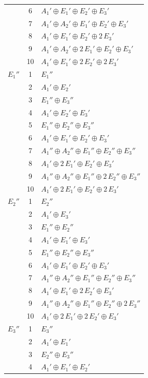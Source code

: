 \documentclass[11pt]{article}
\begin{document}
\begin{longtable}{l c p{}}
 & 6 & $A_{1}'\oplus E_{1}'\oplus E_{2}'\oplus E_{3}'$\\
 & 7 & $A_{1}'\oplus A_{2}'\oplus E_{1}'\oplus E_{2}'\oplus E_{3}'$\\
 & 8 & $A_{1}'\oplus E_{1}'\oplus E_{2}'\oplus 2\,E_{3}'$\\
 & 9 & $A_{1}'\oplus A_{2}'\oplus 2\,E_{1}'\oplus E_{2}'\oplus E_{3}'$\\
 & 10 & $A_{1}'\oplus E_{1}'\oplus 2\,E_{2}'\oplus 2\,E_{3}'$\\
\hline
$E_{1}''$ & 1 & $E_{1}''$\\
 & 2 & $A_{1}'\oplus E_{2}'$\\
 & 3 & $E_{1}''\oplus E_{3}''$\\
 & 4 & $A_{1}'\oplus E_{2}'\oplus E_{3}'$\\
 & 5 & $E_{1}''\oplus E_{2}''\oplus E_{3}''$\\
 & 6 & $A_{1}'\oplus E_{1}'\oplus E_{2}'\oplus E_{3}'$\\
 & 7 & $A_{1}''\oplus A_{2}''\oplus E_{1}''\oplus E_{2}''\oplus E_{3}''$\\
 & 8 & $A_{1}'\oplus 2\,E_{1}'\oplus E_{2}'\oplus E_{3}'$\\
 & 9 & $A_{1}''\oplus A_{2}''\oplus E_{1}''\oplus 2\,E_{2}''\oplus E_{3}''$\\
 & 10 & $A_{1}'\oplus 2\,E_{1}'\oplus E_{2}'\oplus 2\,E_{3}'$\\
\hline
$E_{2}''$ & 1 & $E_{2}''$\\
 & 2 & $A_{1}'\oplus E_{3}'$\\
 & 3 & $E_{1}''\oplus E_{2}''$\\
 & 4 & $A_{1}'\oplus E_{1}'\oplus E_{3}'$\\
 & 5 & $E_{1}''\oplus E_{2}''\oplus E_{3}''$\\
 & 6 & $A_{1}'\oplus E_{1}'\oplus E_{2}'\oplus E_{3}'$\\
 & 7 & $A_{1}''\oplus A_{2}''\oplus E_{1}''\oplus E_{2}''\oplus E_{3}''$\\
 & 8 & $A_{1}'\oplus E_{1}'\oplus 2\,E_{2}'\oplus E_{3}'$\\
 & 9 & $A_{1}''\oplus A_{2}''\oplus E_{1}''\oplus E_{2}''\oplus 2\,E_{3}''$\\
 & 10 & $A_{1}'\oplus 2\,E_{1}'\oplus 2\,E_{2}'\oplus E_{3}'$\\
\hline
$E_{3}''$ & 1 & $E_{3}''$\\
 & 2 & $A_{1}'\oplus E_{1}'$\\
 & 3 & $E_{2}''\oplus E_{3}''$\\
 & 4 & $A_{1}'\oplus E_{1}'\oplus E_{2}'$\\

\end{longtable}
\end{document}
